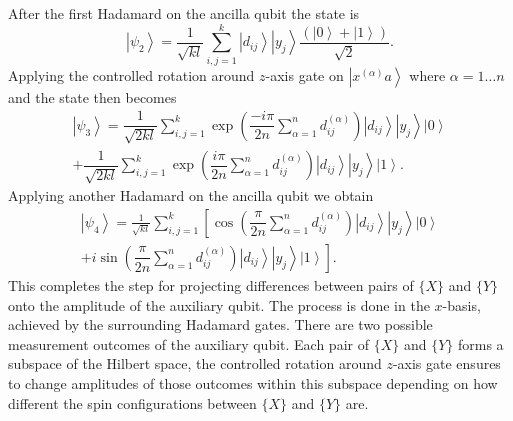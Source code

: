 \documentclass[pra,showkeys,twocolumn,showpacs]{revtex4-1}
\begin{document}
After the first Hadamard on the ancilla qubit the state is
%
\begin{equation}
    \left| \psi_2 \right\rangle = 
    \frac{1}{\sqrt{kl}}\sum\limits_{i, j=1}^{k} 
    \left| d_{ij} \right\rangle 
    \left| y_j \right\rangle
    \dfrac{(\left| 0 \right\rangle + \left| 1 \right\rangle)}{\sqrt{2}}  .
\end{equation}
%
Applying the controlled rotation around $z$-axis gate on $\left| x^{(\alpha)} a \right\rangle$ where $\alpha = 1\dots n$ and the state then becomes
%
\begin{multline}
    \left| \psi_3 \right\rangle  
	= \dfrac{1}{\sqrt{2kl}} \sum\limits_{i, j=1}^{k} 
		\exp\left(
		    \dfrac{-i \pi}{2n}
		    \sum\limits_{\alpha=1}^n d^{(\alpha)}_{ij}
		\right)
		\left| d_{ij} \right\rangle 
		\left| y_j \right\rangle 
		\left| 0 \right\rangle \\
    + \dfrac{1}{\sqrt{2kl}} \sum\limits_{i, j=1}^{k}
		\exp\left(
		    \dfrac{i \pi}{2n}
		    \sum\limits_{\alpha=1}^n d^{(\alpha)}_{ij} 
		\right)
		\left| d_{ij} \right\rangle  
		\left| y_j \right\rangle 
		\left| 1 \right\rangle .
\end{multline}
%
Applying another Hadamard on the ancilla qubit we obtain
%
\begin{multline}
    \left| \psi_4 \right\rangle = 
    \frac{1}{\sqrt{kl}}\sum\limits_{i, j=1}^{k} 
        \left[ 
			\cos\left(
			    \dfrac{\pi}{2n}
			    \sum\limits_{\alpha=1}^n d^{(\alpha)}_{ij}
			\right)
			\left| d_{ij} \right\rangle 
			\left| y_j \right\rangle 
			\left| 0 \right\rangle\right.
			\\+ 
			\left. i \sin\left(
			    \dfrac{\pi}{2n} 
			    \sum\limits_{\alpha=1}^n d^{(\alpha)}_{ij} 
			\right)
			\left| d_{ij} \right\rangle 
			\left| y_j \right\rangle 
			\left| 1 \right\rangle
		\right] .
\end{multline}
%
This completes the step for projecting differences between pairs of $\{X\}$ and $\{Y\}$ onto the amplitude of the auxiliary qubit. 
The process is done in the $x$-basis, achieved by the surrounding Hadamard gates. 
There are two possible measurement outcomes of the auxiliary qubit.  
Each pair of $\{X\}$ and $\{Y\}$ forms a subspace of the Hilbert space, 
the controlled rotation around $z$-axis gate ensures to change amplitudes of those outcomes within this subspace depending on how different the spin configurations between $\{X\}$ and $\{Y\}$ are.
\end{document}
